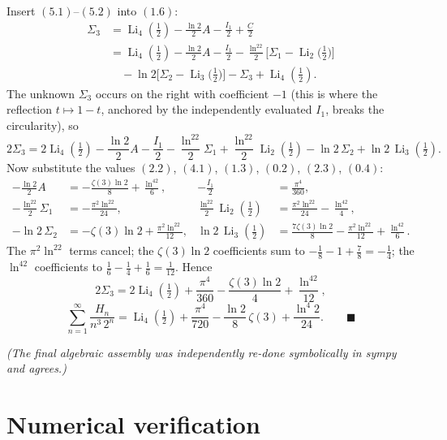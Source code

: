 \documentclass[11pt]{article}
\theoremstyle{remark}
\begin{document}
Insert $(5.1)$–$(5.2)$ into $(1.6)$:
$$\begin{aligned}
\Sigma_3&=\operatorname{Li}_4\!\left(\tfrac12\right)-\frac{\ln2}{2}A-\frac{I_1}{2}+\frac{C}{2}\\
&=\operatorname{Li}_4\!\left(\tfrac12\right)-\frac{\ln2}{2}A-\frac{I_1}{2}
-\frac{\ln^22}{2}\Big[\Sigma_1-\operatorname{Li}_2\!\Big(\tfrac12\Big)\Big]\\
&\quad-\ln2\Big[\Sigma_2-\operatorname{Li}_3\!\Big(\tfrac12\Big)\Big]-\Sigma_3+\operatorname{Li}_4\!\left(\tfrac12\right).
\end{aligned}$$
The unknown $\Sigma_3$ occurs on the right with coefficient $-1$ (this is where the reflection $t\mapsto1-t$, anchored by the independently evaluated $I_1$, breaks the circularity), so
$$2\Sigma_3=2\operatorname{Li}_4\!\left(\tfrac12\right)-\frac{\ln2}{2}A-\frac{I_1}{2}
-\frac{\ln^22}{2}\Sigma_1+\frac{\ln^22}{2}\operatorname{Li}_2\!\left(\tfrac12\right)
-\ln2\,\Sigma_2+\ln2\,\operatorname{Li}_3\!\left(\tfrac12\right).$$
Now substitute the values $(2.2)$, $(4.1)$, $(1.3)$, $(0.2)$, $(2.3)$, $(0.4)$:
$$
\begin{aligned}
-\frac{\ln2}{2}A&=-\frac{\zeta(3)\ln2}{8}+\frac{\ln^42}{6}, &
-\frac{I_1}{2}&=\frac{\pi^4}{360},\\[2pt]
-\frac{\ln^22}{2}\Sigma_1&=-\frac{\pi^2\ln^22}{24}, &
\frac{\ln^22}{2}\operatorname{Li}_2\!\left(\tfrac12\right)&=\frac{\pi^2\ln^22}{24}-\frac{\ln^42}{4},\\[2pt]
-\ln2\,\Sigma_2&=-\zeta(3)\ln2+\frac{\pi^2\ln^22}{12}, &
\ln2\,\operatorname{Li}_3\!\left(\tfrac12\right)&=\frac{7\zeta(3)\ln2}{8}-\frac{\pi^2\ln^22}{12}+\frac{\ln^42}{6}.
\end{aligned}
$$
The $\pi^2\ln^22$ terms cancel; the $\zeta(3)\ln2$ coefficients sum to $-\tfrac18-1+\tfrac78=-\tfrac14$; the $\ln^42$ coefficients to $\tfrac16-\tfrac14+\tfrac16=\tfrac1{12}$. Hence
$$2\Sigma_3=2\operatorname{Li}_4\!\left(\tfrac12\right)+\frac{\pi^4}{360}-\frac{\zeta(3)\ln2}{4}+\frac{\ln^42}{12},$$
$$\sum_{n=1}^\infty\frac{H_n}{n^3\,2^n}
=\operatorname{Li}_4\!\left(\tfrac12\right)+\frac{\pi^4}{720}-\frac{\ln 2}{8}\,\zeta(3)+\frac{\ln^4 2}{24}. \qquad\blacksquare$$

\textit{(The final algebraic assembly was independently re-done symbolically in sympy and agrees.)}

\section*{Numerical verification}
\end{document}
